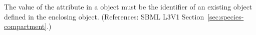 The value of the attribute  in a \Species object must be
the identifier of an existing \Compartment object defined in the enclosing
\Model object.  (References: SBML L3V1
Section~\ref{sec:species-compartment}.)
